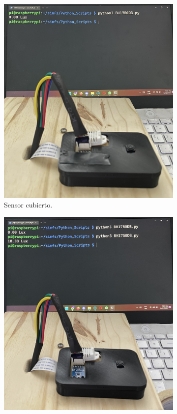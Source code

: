 \begin{figure}[H]
	\centering
    \begin{subfigure}{0.33\textwidth}
    	\centering
        \includegraphics[width=\linewidth]{ImagenesValidacion del prototipo/TINTFUN3a}
        \caption{Sensor cubierto.}
	\end{subfigure}\hfill
    \begin{subfigure}{0.33\textwidth}
    	\centering
        \includegraphics[width=\linewidth]{ImagenesValidacion del prototipo/TINTFUN3b}

\end{subfigure}
\end{figure}
